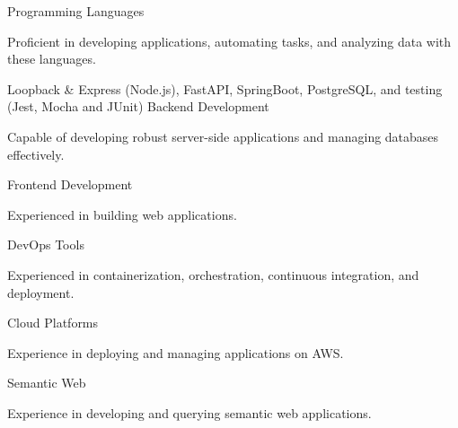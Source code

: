 \begin{cventries}
   {Programming Languages} {}
  {} { \begin{cvitems}\item {Proficient in developing applications, automating tasks, and analyzing data with these languages.}\end{cvitems} }

  \cventry
  {Loopback \& Express (Node.js), FastAPI, SpringBoot, PostgreSQL, and testing (Jest, Mocha and JUnit)}
  {Backend Development} {} {}
  { \begin{cvitems}\item{Capable of developing robust server-side applications and managing databases effectively.}\end{cvitems} }

   {Frontend Development} {} {} { \begin{cvitems}\item {Experienced in building web applications.}\end{cvitems} }

   {DevOps Tools} {}
  {}
  { \begin{cvitems}\item {Experienced in containerization, orchestration, continuous integration, and deployment.}\end{cvitems} }

   {Cloud Platforms} {} {} { \begin{cvitems}\item {Experience in deploying and managing applications on AWS.}\end{cvitems} }

   {Semantic Web} {} {}
  { \begin{cvitems}\item {Experience in developing and querying semantic web applications.}\end{cvitems} }
\end{cventries}